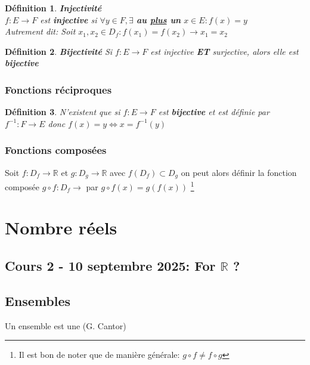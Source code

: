 \documentclass[10pt,a4paper]{book}
\newcommand{\R}{\mathbb{R}}
\newtheorem{definition}{Définition}[section]
\begin{document}
\begin{definition} \textbf{Injectivité}\\
$f: E \rightarrow F$ est \textbf{injective} si $\forall y \in F, \exists$ \textbf{au \underline{plus} un} $x\in E: f(x) = y$ \\
Autrement dit: Soit $x_1, x_2 \in D_f: f(x_1) = f(x_2) \rightarrow x_1 = x_2$
\end{definition}

\begin{definition} \textbf{Bijectivité}
Si $f: E \rightarrow F$ est injective \textbf{ET} surjective, alors elle est \textbf{bijective}
\end{definition}

\subsection{Fonctions réciproques}

\begin{definition}
N'existent que si $f: E \rightarrow F$ est \textbf{bijective} et est définie par $f^{-1}: F \rightarrow E$ donc $f(x) = y \Leftrightarrow x = f^{-1}(y)$
\end{definition}

\subsection{Fonctions composées}

Soit $f: D_f \rightarrow \R$ et $g: D_g \rightarrow \R$ avec $f(D_f) \subset D_g$ on peut alors définir la fonction composée $g\circ f : D_f \rightarrow$ par $g\circ f(x) = g(f(x))$ \footnote{Il est bon de noter que de manière générale: $g\circ f \neq f\circ g$}

\chapter{Nombre réels}

\section*{Cours 2 - 10 septembre 2025: For $\R$ ?}

\section{Ensembles}

Un ensemble est une  (G. Cantor) 
\end{document}
